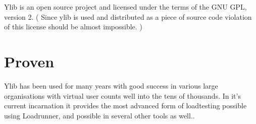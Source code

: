 Ylib is an open source project and licensed under the terms of the G\-N\-U G\-P\-L, version 2. ( Since ylib is used and distributed as a piece of source code violation of this license should be almost impossible. )

\section*{Proven}

Ylib has been used for many years with good success in various large organisations with virtual user counts well into the tens of thousands. In it's current incarnation it provides the most advanced form of loadtesting possible using Loadrunner, and possible in several other tools as well.. 